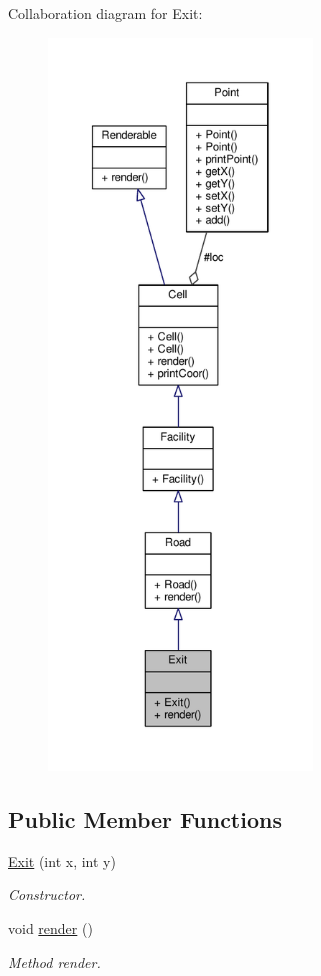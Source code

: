 Collaboration diagram for Exit\+:
\nopagebreak
\begin{figure}[H]
\begin{center}
\leavevmode
\includegraphics[height=550pt]{classExit__coll__graph}
\end{center}
\end{figure}
\subsection*{Public Member Functions}
\begin{DoxyCompactItemize}
\item 
\hyperlink{classExit_abb37d76b2e66fac8cac92fd61dfee563}{Exit} (int x, int y)
\begin{DoxyCompactList}\small\item\em Constructor. \end{DoxyCompactList}\item 
void \hyperlink{classExit_a7d8dae4579c58c28ab444de0fc4e62f5}{render} ()\hypertarget{classExit_a7d8dae4579c58c28ab444de0fc4e62f5}{}\label{classExit_a7d8dae4579c58c28ab444de0fc4e62f5}

\begin{DoxyCompactList}\small\item\em Method render. \end{DoxyCompactList}\end{DoxyCompactItemize}
